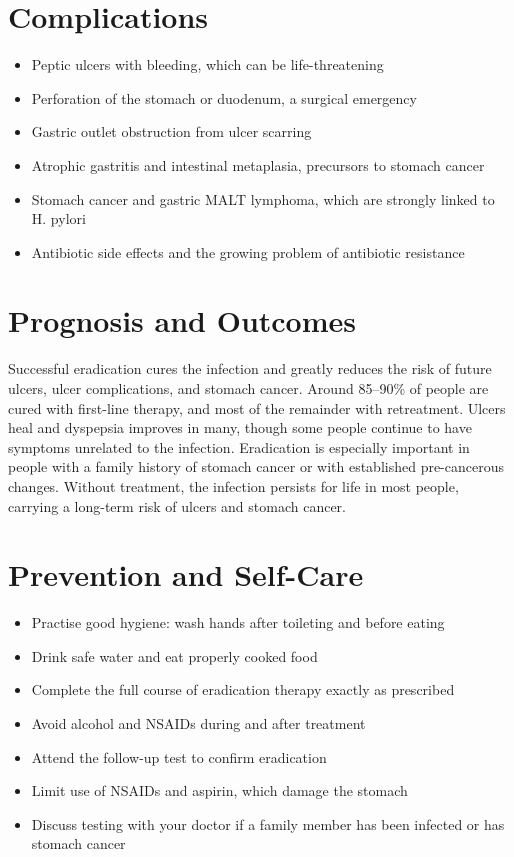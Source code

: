 \section*{Complications}
\begin{itemize}
    \item Peptic ulcers with bleeding, which can be life-threatening
    \item Perforation of the stomach or duodenum, a surgical emergency
    \item Gastric outlet obstruction from ulcer scarring
    \item Atrophic gastritis and intestinal metaplasia, precursors to stomach cancer
    \item Stomach cancer and gastric MALT lymphoma, which are strongly linked to H. pylori
    \item Antibiotic side effects and the growing problem of antibiotic resistance
\end{itemize}

\section*{Prognosis and Outcomes}
Successful eradication cures the infection and greatly reduces the risk of future ulcers, ulcer complications, and stomach cancer. Around 85--90\% of people are cured with first-line therapy, and most of the remainder with retreatment. Ulcers heal and dyspepsia improves in many, though some people continue to have symptoms unrelated to the infection. Eradication is especially important in people with a family history of stomach cancer or with established pre-cancerous changes. Without treatment, the infection persists for life in most people, carrying a long-term risk of ulcers and stomach cancer.

\section*{Prevention and Self-Care}
\begin{itemize}
    \item Practise good hygiene: wash hands after toileting and before eating
    \item Drink safe water and eat properly cooked food
    \item Complete the full course of eradication therapy exactly as prescribed
    \item Avoid alcohol and NSAIDs during and after treatment
    \item Attend the follow-up test to confirm eradication
    \item Limit use of NSAIDs and aspirin, which damage the stomach
    \item Discuss testing with your doctor if a family member has been infected or has stomach cancer
\end{itemize}


